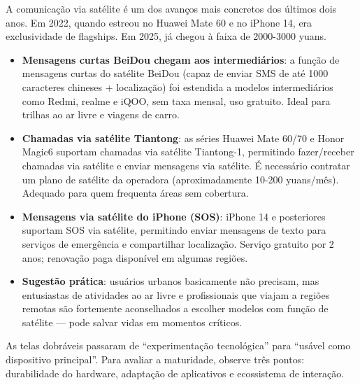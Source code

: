 
A comunicação via satélite é um dos avanços mais concretos dos últimos dois anos. Em 2022, quando estreou no Huawei Mate 60 e no iPhone 14, era exclusividade de flagships. Em 2025, já chegou à faixa de 2000-3000 yuans.

\begin{itemize}
  \item \textbf{Mensagens curtas BeiDou chegam aos intermediários}: a função de mensagens curtas do satélite BeiDou (capaz de enviar SMS de até 1000 caracteres chineses + localização) foi estendida a modelos intermediários como Redmi, realme e iQOO, sem taxa mensal, uso gratuito. Ideal para trilhas ao ar livre e viagens de carro.
  \item \textbf{Chamadas via satélite Tiantong}: as séries Huawei Mate 60/70 e Honor Magic6 suportam chamadas via satélite Tiantong-1, permitindo fazer/receber chamadas via satélite e enviar mensagens via satélite. É necessário contratar um plano de satélite da operadora (aproximadamente 10-200 yuans/mês). Adequado para quem frequenta áreas sem cobertura.
  \item \textbf{Mensagens via satélite do iPhone (SOS)}: iPhone 14 e posteriores suportam SOS via satélite, permitindo enviar mensagens de texto para serviços de emergência e compartilhar localização. Serviço gratuito por 2 anos; renovação paga disponível em algumas regiões.
  \item \textbf{Sugestão prática}: usuários urbanos basicamente não precisam, mas entusiastas de atividades ao ar livre e profissionais que viajam a regiões remotas são fortemente aconselhados a escolher modelos com função de satélite — pode salvar vidas em momentos críticos.
\end{itemize}


As telas dobráveis passaram de “experimentação tecnológica” para “usável como dispositivo principal”. Para avaliar a maturidade, observe três pontos: durabilidade do hardware, adaptação de aplicativos e ecossistema de interação.

